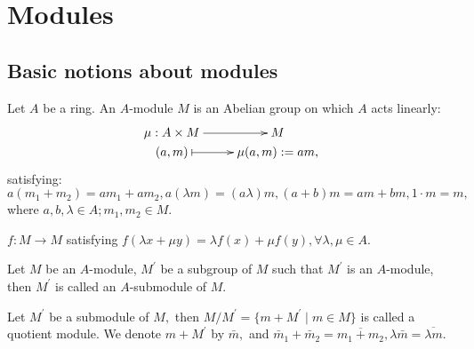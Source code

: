 %
\chapter{Modules}

\newpage

\section{Basic notions about modules}

\begin{Def}
Let $A$ be a ring. An $A$-module $M$ is an Abelian group on which
$A$ acts linearly:
\[ \xymatrix@R=0em{
   \mu: A\times M \ar[r] & M \\
   (a,m) \ar@{|->}[r] & \mu(a,m):=am, }  \]
satisfying: $a(m_1+m_2)=am_1+am_2, a(\lambda m)=(a\lambda)m,
(a+b)m=am+bm, 1\cdot m=m,$ where $a,b,\lambda\in A; m_1,m_2\in M.$
\end{Def}
\begin{Def}
$f: M\rightarrow M$ satisfying $f(\lambda x+\mu y)=\lambda f(x)+\mu
f(y), \forall \lambda,\mu\in A.$
\end{Def}
\begin{Def}
Let $M$ be an $A$-module, $M^{\prime}$ be a subgroup of $M$ such
that $M^{\prime}$ is an $A$-module, then $M^{\prime}$ is called an
$A$-submodule of $M.$
\end{Def}
\begin{Def}
Let $M^{\prime}$ be a submodule of $M,$ then $M/M^{\prime} =
\{m+M^{\prime}\mid m\in M\}$ is called a quotient module. We denote
$m+M^{\prime}$ by $\bar{m},$ and $\bar{m}_1+\bar{m}_2 =
\overline{m_1+m_2}, \lambda \bar{m} = \overline{\lambda m}.$
\end{Def}

